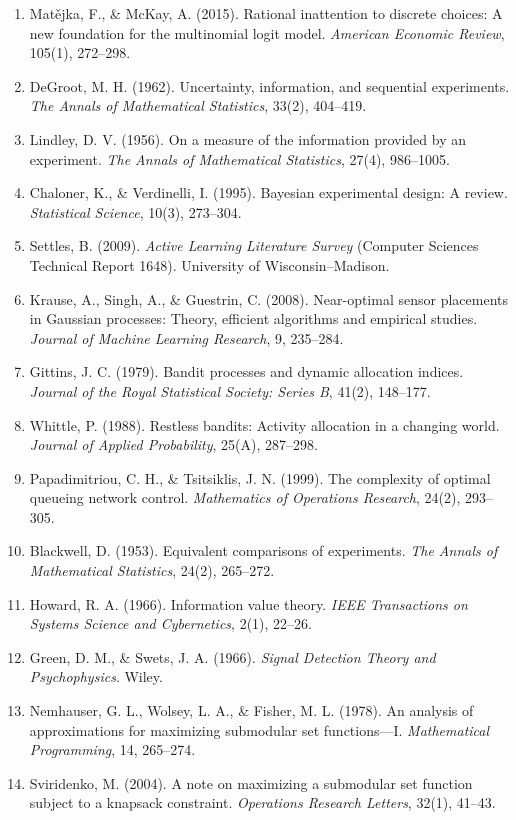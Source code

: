 \documentclass[
  chinese,
  11pt]{article}
\begin{document}
\begin{enumerate}
\item
  Matějka, F., \& McKay, A. (2015). Rational inattention to discrete choices: A new foundation for the multinomial logit model. \emph{American Economic Review}, 105(1), 272--298.
\item
  DeGroot, M. H. (1962). Uncertainty, information, and sequential experiments. \emph{The Annals of Mathematical Statistics}, 33(2), 404--419.
\item
  Lindley, D. V. (1956). On a measure of the information provided by an experiment. \emph{The Annals of Mathematical Statistics}, 27(4), 986--1005.
\item
  Chaloner, K., \& Verdinelli, I. (1995). Bayesian experimental design: A review. \emph{Statistical Science}, 10(3), 273--304.
\item
  Settles, B. (2009). \emph{Active Learning Literature Survey} (Computer Sciences Technical Report 1648). University of Wisconsin--Madison.
\item
  Krause, A., Singh, A., \& Guestrin, C. (2008). Near-optimal sensor placements in Gaussian processes: Theory, efficient algorithms and empirical studies. \emph{Journal of Machine Learning Research}, 9, 235--284.
\item
  Gittins, J. C. (1979). Bandit processes and dynamic allocation indices. \emph{Journal of the Royal Statistical Society: Series B}, 41(2), 148--177.
\item
  Whittle, P. (1988). Restless bandits: Activity allocation in a changing world. \emph{Journal of Applied Probability}, 25(A), 287--298.
\item
  Papadimitriou, C. H., \& Tsitsiklis, J. N. (1999). The complexity of optimal queueing network control. \emph{Mathematics of Operations Research}, 24(2), 293--305.
\item
  Blackwell, D. (1953). Equivalent comparisons of experiments. \emph{The Annals of Mathematical Statistics}, 24(2), 265--272.
\item
  Howard, R. A. (1966). Information value theory. \emph{IEEE Transactions on Systems Science and Cybernetics}, 2(1), 22--26.
\item
  Green, D. M., \& Swets, J. A. (1966). \emph{Signal Detection Theory and Psychophysics}. Wiley.
\item
  Nemhauser, G. L., Wolsey, L. A., \& Fisher, M. L. (1978). An analysis of approximations for maximizing submodular set functions---I. \emph{Mathematical Programming}, 14, 265--274.
\item
  Sviridenko, M. (2004). A note on maximizing a submodular set function subject to a knapsack constraint. \emph{Operations Research Letters}, 32(1), 41--43.

\end{enumerate}
\end{document}
